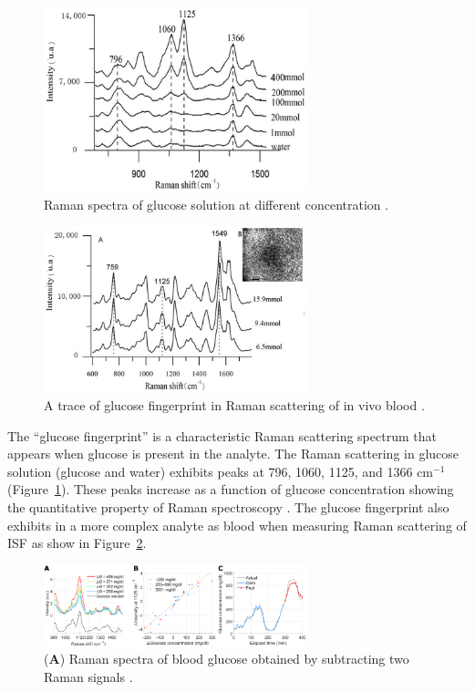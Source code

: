 \begin{figure}
    \caption{Raman spectra of glucose solution at different concentration \citep{solutionGlucose}.}
    \centerline{\includegraphics[width=3in]{figures/solutionGlucose-RS.jpg}} \label{fig:solutionGlucose-RS}
\end{figure}

\begin{figure}
    \caption{A trace of glucose fingerprint in Raman scattering of in vivo blood \citep{solutionGlucose}.}
    \centerline{\includegraphics[width=3in]{figures/bloodGlucose-RS-2012.jpg}}\label{fig:bloodGlucose-relative1125}
\end{figure}

The ``glucose fingerprint'' is a characteristic Raman scattering spectrum that appears when glucose is present in the analyte.
The Raman scattering in glucose solution (glucose and water) exhibits peaks at 796, 1060, 1125, and 1366 $\text{cm}^{-1}$ (Figure~\ref{fig:solutionGlucose-RS}).
These peaks increase as a function of glucose concentration showing the quantitative property of Raman spectroscopy \citep{solutionGlucose}.
The glucose fingerprint also exhibits in a more complex analyte as blood when measuring Raman scattering of ISF \citep{forearm2005, forearm2014, directGlucose, sitecompare} as show in Figure~\ref{fig:bloodGlucose-relative1125}.

\begin{figure}
    \caption{(\textbf{A}) Raman spectra of blood glucose obtained by subtracting two Raman signals \citep{directGlucose}.}
    \centerline{\includegraphics[width=3in]{figures/bloodGlucose-DeltaG.png}}\label{fig:bloodGlucose-DeltaG}
\end{figure}

